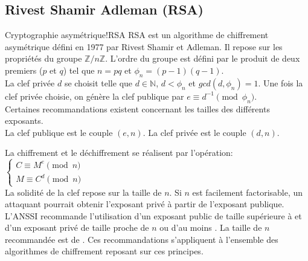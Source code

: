 \documentclass[twoside,a4paper,12pt,titlepage]{book}
\begin{document}
\subsection{Rivest Shamir Adleman (RSA)}
\begin{Define}{Cryptographie asymétrique!RSA}
\gls{RSA} est un algorithme de chiffrement asymétrique défini en 1977 par Rivest Shamir et Adleman. Il repose sur les propriétés du groupe $\mathbb{Z}/n\mathbb{Z}$. L'ordre du groupe est défini par le produit de deux premiers ($p$ et $q$) tel que $n=pq$ et $\phi_n=(p-1)(q-1)$.\\
La clef privée $d$ se choisit telle que $d \in \mathbb{N}$, $d<\phi_n$ et $gcd(d,\phi_n)=1$. Une fois la clef privée choisie, on génère la clef publique par $e\equiv d^{-1} \pmod{\phi_n}$.\\
Certaines recommandations existent concernant les tailles des différents exposants.\\
La clef publique est le couple $(e,n)$. La clef privée est le couple $(d,n)$.
\end{Define}
La chiffrement et le déchiffrement se réalisent par l'opération:\\
$\left\{
\begin{array}{l}
  C \equiv M^e \pmod n\\
  M \equiv C^d \pmod n
\end{array}
\right.$\\
La solidité de la clef repose sur la taille de $n$. Si $n$ est facilement factorisable, un attaquant pourrait obtenir l'exposant privé à partir de l'exposant publique.\\
L'\gls{ANSSI} recommande l'utilisation d'un exposant public de taille supérieure à \ZnZeAnssi et d'un exposant privé de taille proche de $n$ ou d'au moins \ZnZdAnssi. La taille de $n$ recommandée est de \ZnZnAnssi. Ces recommandations s'appliquent à l'ensemble des algorithmes de chiffrement reposant sur ces principes.\\
\end{document}
